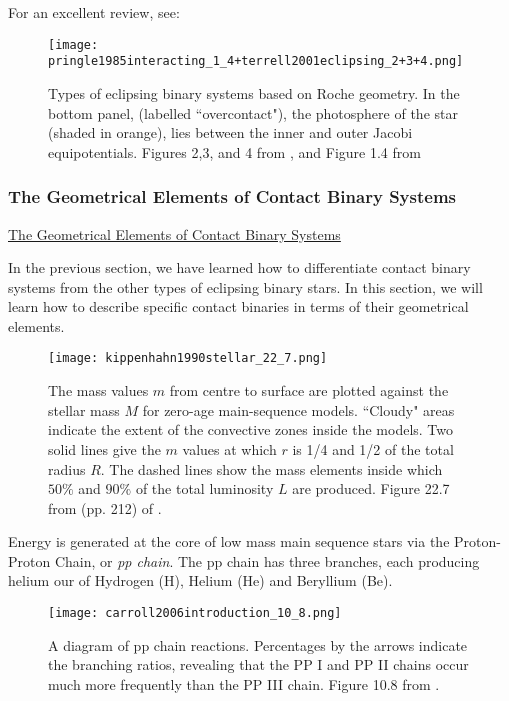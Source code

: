 \documentclass[12pt]{article} %
\numberwithin{equation}{section} %
\begin{document}
For an excellent review, see: \citep{kallrath2009eclipsing}

\begin{figure}[H]
\centering
\texttt{[image: pringle1985interacting\_1\_4+terrell2001eclipsing\_2+3+4.png]}
\caption{Types of eclipsing binary systems based on Roche geometry. In the bottom panel, (labelled ``overcontact"), the photosphere of the star (shaded in orange), lies between the inner and outer Jacobi equipotentials. Figures 2,3, and 4 from \citet{terrell2001eclipsing}, and Figure 1.4 from \citet{pringle1985interacting}}
\label{fig: pringle1985interacting_1_4+terrell2001eclipsing_2+3+4}
\end{figure}

\subsubsection{The Geometrical Elements of Contact Binary Systems}{\hyperlink{toc}{The Geometrical Elements of Contact Binary Systems}} \label{sec: The Geometrical Elements of Contact Binary Systems}

In the previous section, we have learned how to differentiate contact binary systems from the other types of eclipsing binary stars. In this section, we will learn how to describe specific contact binaries in terms of their geometrical elements.



\begin{figure}[H]
\centering
\texttt{[image: kippenhahn1990stellar\_22\_7.png]}
\caption{The mass values $m$ from centre to surface are plotted against the stellar mass $M$ for zero-age main-sequence models. ``Cloudy" areas indicate the extent of the convective zones inside the models. Two solid lines give the $m$ values at which $r$ is 1/4 and 1/2 of the total radius $R$. The dashed lines show the mass elements inside which $50\%$ and $90\%$ of the total luminosity $L$ are produced. Figure 22.7 from (pp. 212) of \citet{kippenhahn1990stellar}.}
\label{fig: kippenhahn1990stellar_22_7}
\end{figure}

Energy is generated at the core of low mass main sequence stars via the Proton-Proton Chain, or \emph{pp chain}. The pp chain has three branches, each producing helium our of Hydrogen (H), Helium (He) and Beryllium (Be). 

\begin{figure}[H]
\centering
\texttt{[image: carroll2006introduction\_10\_8.png]}
\caption{A diagram of pp chain reactions. Percentages by the arrows indicate the branching ratios, revealing that the PP I and PP II chains occur much more frequently than the PP III chain. Figure 10.8 from \citet{carroll2006introduction}.}
\label{fig: carroll2006introduction_10_8}
\end{figure}
\end{document}
